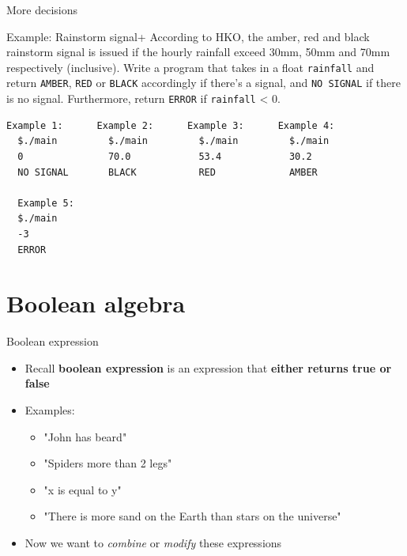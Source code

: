 \documentclass[10pt,xcolor={table,dvipsnames},t]{beamer}
\begin{document}
\begin{frame}[fragile]{More decisions}
  \begin{exampleblock}{Example: Rainstorm signal+}
    According to HKO, the amber, red and black rainstorm signal is issued if the hourly rainfall exceed 30mm, 50mm and 70mm respectively (inclusive). Write a program that takes in a float \texttt{rainfall} and return \texttt{AMBER}, \texttt{RED} or \texttt{BLACK} accordingly if there's a signal, and \texttt{NO SIGNAL} if there is no signal. Furthermore, return \texttt{ERROR} if \texttt{rainfall} < 0.
  \end{exampleblock}
\begin{lstlisting}[language=bash]
  Example 1:      Example 2:      Example 3:      Example 4:
  $./main         $./main         $./main         $./main
  0               70.0            53.4            30.2
  NO SIGNAL       BLACK           RED             AMBER

  Example 5:
  $./main
  -3
  ERROR
\end{lstlisting}
\end{frame}

\section{Boolean algebra}
\begin{frame}{Boolean expression}
  \begin{itemize}
    \item Recall \textbf{boolean expression} is an expression that \textbf{either returns true or false}
    \item Examples:
    \begin{itemize}
      \item "John has beard"
      \item "Spiders more than 2 legs"
      \item "x is equal to y"
      \item "There is more sand on the Earth than stars on the universe"
    \end{itemize}
    \item Now we want to \textit{combine} or \textit{modify} these expressions
  \end{itemize}
\end{frame}
\end{document}
